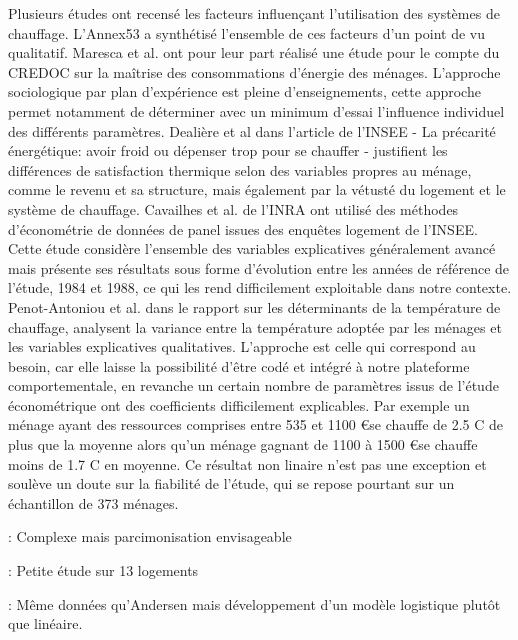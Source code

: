 Plusieurs études ont recensé les facteurs influençant l'utilisation des systèmes de chauffage. L'Annex53 \cite{Annex-53-1} a synthétisé l'ensemble de ces facteurs d'un point de vu qualitatif. Maresca et al. \cite{Maresca-09} ont pour leur part réalisé une étude pour le compte du CREDOC sur la maîtrise des consommations d'énergie des ménages. L'approche sociologique par plan d'expérience est pleine d'enseignements, cette approche permet notamment de déterminer avec un minimum d'essai l'influence individuel des différents paramètres. Dealière et al \cite{Devaliere-11} dans l'article de l'INSEE - La précarité énergétique: avoir froid ou dépenser trop pour se chauffer - justifient les différences de satisfaction thermique selon des variables propres au ménage, comme le revenu et sa structure, mais également par la vétusté du logement et le système de chauffage. Cavailhes et al.\cite{Cavailhes-11} de l'INRA  ont utilisé des méthodes d'économétrie de données de panel issues des enquêtes logement de l'INSEE. Cette étude considère l'ensemble des variables explicatives généralement avancé mais présente ses résultats sous forme d'évolution entre les années de référence de l'étude, 1984 et 1988, ce qui les rend difficilement exploitable dans notre contexte. Penot-Antoniou et al. \cite{Penot-Antoniou-13} dans le rapport sur les déterminants de la température de chauffage, analysent la variance entre la température adoptée par les ménages et les variables explicatives qualitatives. L'approche est celle qui correspond au besoin, car elle laisse la possibilité d'être codé et intégré à notre plateforme comportementale, en revanche un certain nombre de paramètres issus de l'étude économétrique ont des coefficients difficilement explicables. Par exemple un ménage ayant des ressources comprises entre 535 et 1100 \euro se chauffe de 2.5 \degre C de plus que la moyenne alors qu'un ménage gagnant de 1100 à 1500 \euro se chauffe moins de 1.7 \degre C en moyenne. Ce résultat non linaire n'est pas une exception et soulève un doute sur la fiabilité de l'étude, qui se repose pourtant sur un échantillon de 373 ménages.

\cite{Kelly-13} : Complexe mais parcimonisation envisageable

\cite{Andersen-09} : Petite étude sur 13 logements

\cite{Fabi-13}: Même données qu'Andersen mais développement d'un modèle logistique plutôt que linéaire.


